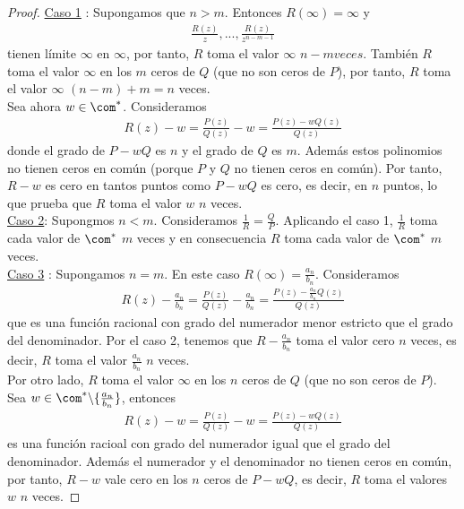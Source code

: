 \begin{proof}
\underline{Caso 1} : Supongamos que $n > m$. Entonces $R(\infty) = \infty$ y 
\begin{align*}
    \frac{R(z)}{z}, ..., \frac{R(z)}{z^{n - m - 1}}
\end{align*}
tienen límite $\infty$ en $\infty$, por tanto, $R$ toma el valor $\infty$ $n -m veces$. También $R$ toma el valor $\infty$ en los $m$ ceros de $Q$ (que no son ceros de $P$), por tanto, $R$ toma el valor $\infty$ $(n - m) + m = n$ veces.
\\
\newline
Sea ahora $w \in \com^*$. Consideramos
\begin{align*}
    R(z) - w = \frac{P(z)}{Q(z)} - w = \frac{P(z) - wQ(z)}{Q(z)}
\end{align*}
donde el grado de $P - wQ$ es $n$ y el grado de $Q$ es $m$. Además estos polinomios no tienen ceros en común (porque $P$ y $Q$ no tienen ceros en común). Por tanto, $R - w$ es cero en tantos puntos como $P - wQ$ es cero, es decir, en $n$ puntos, lo que prueba que $R$ toma el valor $w$ $n$ veces.
\\
\newline
\underline{Caso 2}: Supongmos $n < m$. Consideramos $\frac{1}{R} = \frac{Q}{P}$. Aplicando el caso 1, $\frac{1}{R}$ toma cada valor de $\com^*$ $m$ veces y en consecuencia $R$ toma cada valor de $\com^*$ $m$ veces.
\\
\newline
\underline{Caso 3} : Supongamos $n = m$. En este caso $R(\infty) = \frac{a_n}{b_n}$. Consideramos
\begin{align*}
    R(z) - \frac{a_n}{b_n} = \frac{P(z)}{Q(z)} - \frac{a_n}{b_n} = \frac{P(z) - \frac{a_n}{b_n}Q(z)}{Q(z)}
\end{align*}
que es una función racional con grado del numerador menor estricto que el grado del denominador. Por el caso 2, tenemos que $R - \frac{a_n}{b_n}$ toma el valor cero $n$ veces, es decir, $R$ toma el valor $\frac{a_n}{b_n}$ $n$ veces.
\\
\newline
Por otro lado, $R$ toma el valor $\infty$ en los $n$ ceros de $Q$ (que no son ceros de $P$). Sea $w \in \com^* \backslash \{ \frac{a_n}{b_n} \}$, entonces
\begin{align*}
    R(z) - w = \frac{P(z)}{Q(z)} - w = \frac{P(z) - wQ(z)}{Q(z)}
\end{align*}
es una función racioal con grado del numerador igual que el grado del denominador. Además el numerador y el denominador no tienen ceros en común, por tanto, $R - w$ vale cero en los $n$ ceros de $P - wQ$, es decir, $R$ toma el valores $w$ $n$ veces.
\end{proof}
